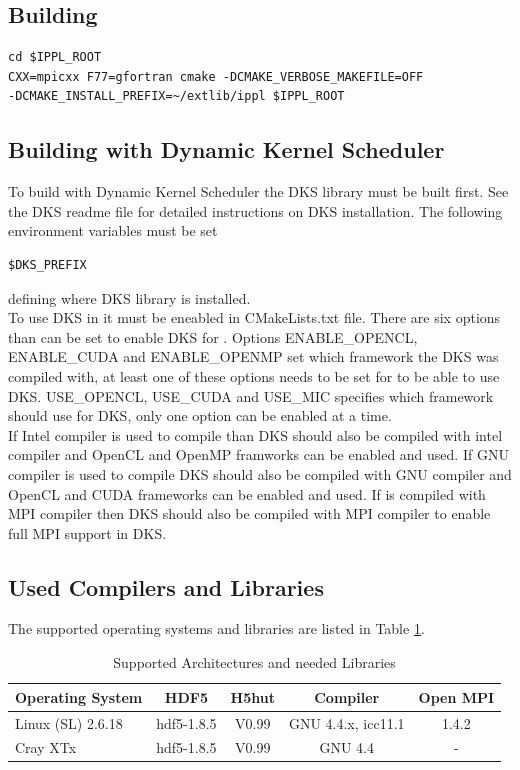 \subsection{Building \ippl}
\begin{verbatim}
cd $IPPL_ROOT
CXX=mpicxx F77=gfortran cmake -DCMAKE_VERBOSE_MAKEFILE=OFF
-DCMAKE_INSTALL_PREFIX=~/extlib/ippl $IPPL_ROOT
\end{verbatim}


\subsection{Building \ippl with Dynamic Kernel Scheduler}
To build \ippl with Dynamic Kernel Scheduler the DKS library must be built first. See the DKS readme file
for detailed instructions on DKS installation. The following environment variables must be set
\begin{verbatim}
$DKS_PREFIX
\end{verbatim}
defining where DKS library is installed.\\
To use DKS in \ippl it must be eneabled in CMakeLists.txt file. There are six options than can be set to
enable DKS for \ippl. Options ENABLE\_OPENCL, ENABLE\_CUDA and ENABLE\_OPENMP set which framework the
DKS  was compiled with, at least one of these options needs to be set for \ippl to be able
to use DKS. USE\_OPENCL, USE\_CUDA and USE\_MIC specifies which framework \ippl should use for DKS, only one
option can be enabled at a time.\\
If Intel compiler is used to compile \ippl than DKS should also be compiled
with intel compiler and OpenCL and OpenMP framworks can be enabled and used. If GNU compiler is used to compile
\ippl DKS should also be compiled with GNU compiler and OpenCL and CUDA frameworks can be enabled and used.
If \ippl is compiled with MPI compiler then DKS should also be compiled with MPI compiler to enable full MPI
support in DKS.


\subsection{Used Compilers and Libraries}
The supported operating systems and libraries are listed in Table \ref{tab:archlib}.
\begin{table}[h]
  \caption{Supported Architectures and needed Libraries}
  \label{tab:archlib}
  \begin{center}
    \begin{tabular}{|lcccc|}
      \hline
      Operating System & HDF5  & H5hut & Compiler & Open MPI\\
      \hline
      Linux (SL) 2.6.18 & hdf5-1.8.5 & V0.99 & GNU 4.4.x, icc11.1 & 1.4.2 \\
      Cray XTx  & hdf5-1.8.5 & V0.99 & GNU 4.4 & - \\
      \hline
    \end{tabular}
  \end{center}
\end{table}





